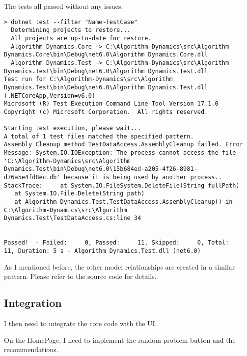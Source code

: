 \documentclass[report.tex]{subfiles}
\begin{document}
The tests all passed without any issues.

\begin{verbatim}
> dotnet test --filter "Name~TestCase"
  Determining projects to restore...
  All projects are up-to-date for restore.
  Algorithm Dynamics.Core -> C:\Algorithm-Dynamics\src\Algorithm Dynamics.Core\bin\Debug\net6.0\Algorithm Dynamics.Core.dll
  Algorithm Dynamics.Test -> C:\Algorithm-Dynamics\src\Algorithm Dynamics.Test\bin\Debug\net6.0\Algorithm Dynamics.Test.dll
Test run for C:\Algorithm-Dynamics\src\Algorithm Dynamics.Test\bin\Debug\net6.0\Algorithm Dynamics.Test.dll (.NETCoreApp,Version=v6.0)
Microsoft (R) Test Execution Command Line Tool Version 17.1.0
Copyright (c) Microsoft Corporation.  All rights reserved.

Starting test execution, please wait...
A total of 1 test files matched the specified pattern.
Assembly Cleanup method TestDataAccess.AssemblyCleanup failed. Error Message: System.IO.IOException: The process cannot access the file 'C:\Algorithm-Dynamics\src\Algorithm Dynamics.Test\bin\Debug\net6.0\15b684ed-a205-4f26-8981-d76a5e4fd8ec.db' because it is being used by another process.. StackTrace:     at System.IO.FileSystem.DeleteFile(String fullPath)
   at System.IO.File.Delete(String path)
   at Algorithm_Dynamics.Test.TestDataAccess.AssemblyCleanup() in C:\Algorithm-Dynamics\src\Algorithm Dynamics.Test\TestDataAccess.cs:line 34


Passed!  - Failed:     0, Passed:     11, Skipped:     0, Total:     11, Duration: 5 s - Algorithm Dynamics.Test.dll (net6.0)
\end{verbatim}

As I mentioned before, the other model relationships are created in a similar pattern. Please refer to the source code for details.

\subsection{Integration}

I then need to integrate the core code with the UI.

On the HomePage, I need to implement the random problem button and the recommendations.
\end{document}
